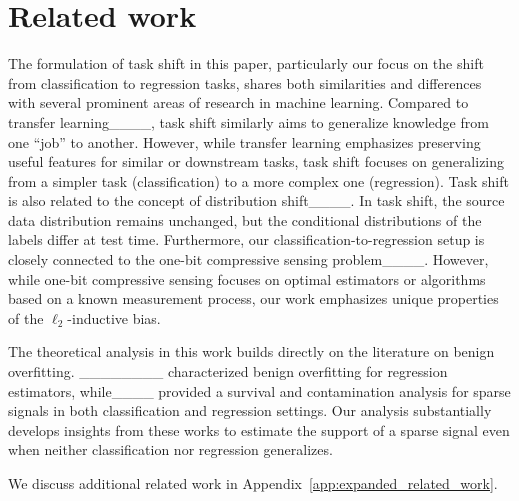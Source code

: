 \section{Related work}
\label{sec:relatedwork}

The formulation of task shift in this paper, particularly our focus on the shift from classification to regression tasks, shares both similarities and differences with several prominent areas of research in machine learning. Compared to transfer learning____, task shift similarly aims to generalize knowledge from one ``job'' to another. However, while transfer learning emphasizes preserving useful features for similar or downstream tasks, task shift focuses on generalizing from a simpler task (\eg classification) to a more complex one (\eg regression). Task shift is also related to the concept of distribution shift____. In task shift, the source data distribution remains unchanged, but the conditional distributions of the labels differ at test time. Furthermore, our classification-to-regression setup is closely connected to the one-bit compressive sensing problem____. However, while one-bit compressive sensing focuses on optimal estimators or algorithms based on a known measurement process, our work emphasizes unique properties of the $\ell_2$-inductive bias.

The theoretical analysis in this work builds directly on the literature on benign overfitting. ________ characterized benign overfitting for regression estimators, while____ provided a survival and contamination analysis for sparse signals in both classification and regression settings. Our analysis substantially develops insights from these works to estimate the support of a sparse signal even when neither classification nor regression generalizes.

We discuss additional related work in Appendix~\ref{app:expanded_related_work}.